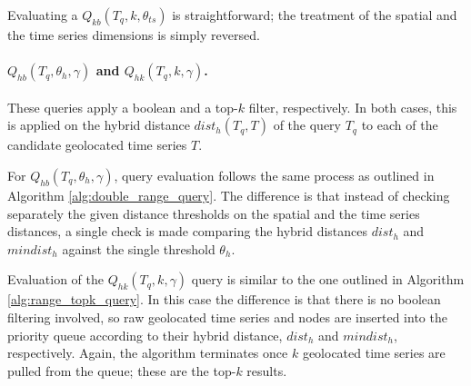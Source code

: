 Evaluating a $Q_{kb}(T_q, k, \theta_{ts})$ is straightforward; the treatment of the spatial and the time series dimensions is simply reversed.

\begin{algorithm}[!t]
	\DontPrintSemicolon
	\begin{footnotesize}
	\BlankLine
	\end{footnotesize}
	\caption{$Q_{bk}(T_q, \theta_{sp}, k)$}
	\label{alg:range_topk_query}	
\end{algorithm}

\paragraph{$Q_{hb}(T_q, \theta_h, \gamma)$ and $Q_{hk}(T_q, k, \gamma)$.} These queries apply a boolean and a top-$k$ filter, respectively. In both cases, this is applied on the hybrid distance $dist_h(T_q, T)$ of the query $T_q$ to each of the candidate geolocated time series $T$.

For $Q_{hb}(T_q, \theta_h, \gamma)$, query evaluation follows the same process as outlined in Algorithm \ref{alg:double_range_query}. The difference is that instead of checking separately the given distance thresholds on the spatial and the time series distances, a single check is made comparing the hybrid distances $dist_h$ and $mindist_h$ against the single threshold $\theta_h$.

Evaluation of the $Q_{hk}(T_q, k, \gamma)$ query is similar to the one outlined in Algorithm \ref{alg:range_topk_query}. In this case the difference is that there is no boolean filtering involved, so raw geolocated time series and nodes are inserted into the priority queue according to their hybrid distance, $dist_h$ and $mindist_h$, respectively. Again, the algorithm terminates once $k$ geolocated time series are pulled from the queue; these are the top-$k$ results.

